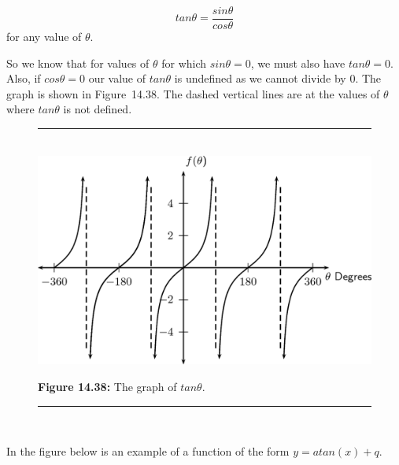 \begin{equation}
tan\theta =\frac{sin\theta }{cos\theta }\tag{14.37}
\end{equation}
\label{m39414*id90014}for any value of $\theta $.\par 
\label{m39414*id90030}So we know that for values of $\theta $ for which $sin\theta =0$, we must also have $tan\theta =0$. Also, if $cos\theta =0$ our value of $tan\theta $ is undefined as we cannot divide by 0. The graph is shown in Figure~14.38. The dashed vertical lines are at the values of $\theta $ where $tan\theta $ is not defined.\par 
\setcounter{subfigure}{0}
\begin{figure}[H] %
\begin{center}
\rule[.1in]{\figurerulewidth}{.005in} \\
\label{m39414*uid71!!!underscore!!!media}\label{m39414*uid71!!!underscore!!!printimage}\includegraphics{col11306.imgs/m39414_MG10C15_044.png} %
\vspace{2pt}
\vspace{\rubberspace}\par \begin{cnxcaption}
\small \textbf{Figure 14.38: }The graph of $tan\theta $.
\end{cnxcaption}
\vspace{.1in}
\rule[.1in]{\figurerulewidth}{.005in} \\
\end{center}
\end{figure}       
\label{m39414*uid72}
\nopagebreak
\label{m39414*id90209}In the figure below is an example of a function of the form $y=atan\left(x\right)+q$.\par 

